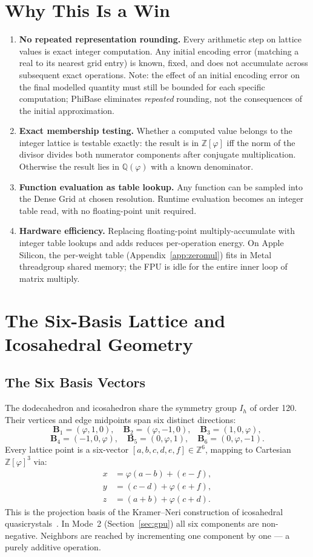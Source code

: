 \documentclass[12pt]{article}
\theoremstyle{definition}
\theoremstyle{remark}
\newcommand{\Z}{\mathbb{Z}}
\newcommand{\Zphi}{\mathbb{Z}[\varphi]}
\newcommand{\Qphi}{\mathbb{Q}(\varphi)}
\begin{document}
\section{Why This Is a Win}
\begin{enumerate}[leftmargin=*]
\item \textbf{No repeated representation rounding.}
  Every arithmetic step on lattice values is exact integer computation.
  Any initial encoding error (matching a real to its nearest grid entry)
  is known, fixed, and does not accumulate across subsequent exact
  operations.  Note: the effect of an initial encoding error on the
  final modelled quantity must still be bounded for each specific
  computation; PhiBase eliminates \emph{repeated} rounding, not the
  consequences of the initial approximation.
\item \textbf{Exact membership testing.}
  Whether a computed value belongs to the integer lattice is testable
  exactly: the result is in $\Zphi$ iff the norm of the divisor divides
  both numerator components after conjugate multiplication.  Otherwise
  the result lies in $\Qphi$ with a known denominator.
\item \textbf{Function evaluation as table lookup.}
  Any function can be sampled into the Dense Grid at chosen resolution.
  Runtime evaluation becomes an integer table read, with no floating-point
  unit required.
\item \textbf{Hardware efficiency.}
  Replacing floating-point multiply-accumulate with integer table
  lookups and adds reduces per-operation energy.  On Apple Silicon,
  the per-weight table (Appendix~\ref{app:zeromul}) fits in Metal
  threadgroup shared memory; the FPU is idle for the entire inner
  loop of matrix multiply.
\end{enumerate}
\section{The Six-Basis Lattice and Icosahedral Geometry}
\subsection{The Six Basis Vectors}
The dodecahedron and icosahedron share the symmetry group $I_h$ of
order 120.  Their vertices and edge midpoints span six distinct
directions:
\[
  \mathbf{B}_1=(\varphi,1,0),\quad
  \mathbf{B}_2=(\varphi,-1,0),\quad
  \mathbf{B}_3=(1,0,\varphi),
\]
\[
  \mathbf{B}_4=(-1,0,\varphi),\quad
  \mathbf{B}_5=(0,\varphi,1),\quad
  \mathbf{B}_6=(0,\varphi,-1).
\]
Every lattice point is a six-vector $[a,b,c,d,e,f]\in\Z^6$, mapping
to Cartesian $\Zphi^3$ via:
\begin{align}
  x &= \varphi(a-b)+(e-f), \label{eq:x}\\
  y &= (c-d)+\varphi(e+f), \label{eq:y}\\
  z &= (a+b)+\varphi(c+d). \label{eq:z}
\end{align}
This is the projection basis of the Kramer--Neri construction of
icosahedral quasicrystals~\cite{kramer,senechal}.
In Mode~2 (Section~\ref{sec:gpu}) all six components are non-negative.
Neighbors are reached by incrementing one component by one --- a purely
additive operation.
\end{document}
